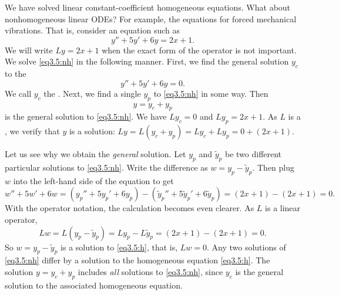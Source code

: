 We have solved linear constant-coefficient homogeneous 
equations.
What about nonhomogeneous linear ODEs?
For example, the equations for forced mechanical vibrations.
That is, consider an equation such as
\begin{equation} \label{eq3.5:nh}
y'' + 5y'+ 6y = 2x+1 .
\end{equation}
%
We will write $Ly = 2x+1$ when the exact form of the operator is not
important.
We solve \eqref{eq3.5:nh} in the following manner.  First, we find the general
solution $y_c$
to the \emph{}
\begin{equation} \label{eq3.5:h}
y'' + 5y'+ 6y = 0 .
\end{equation}
We call $y_c$ the \emph{}.
Next, we find a
single \emph{} $y_p$ to \eqref{eq3.5:nh} in some
way.  Then
\begin{equation*}
y = y_c + y_p
\end{equation*}
is the general solution to \eqref{eq3.5:nh}.  
We have $L y_c = 0$ and $L y_p = 2x+1$.  As
$L$ is a \emph{},
we verify that $y$ is a solution: $L y = L ( y_c + y_p) = L y_c + L y_p = 0
+ (2x+1)$.

Let us see
why we obtain the \emph{general} solution.
Let $y_p$ and $\tilde{y}_p$ be two different
particular solutions 
to \eqref{eq3.5:nh}.
Write the difference as
$w = y_p - \tilde{y}_p$.  Then plug $w$
into the left-hand side of the equation to get
\begin{equation*}
w'' + 5w'+ 6w =
(y_p'' + 5y_p'+ 6y_p) -
(\tilde{y}_p'' + 5\tilde{y}_p'+ 6\tilde{y}_p) =
(2x+1) - (2x+1) = 0 .
\end{equation*}
With the operator notation, the calculation becomes even clearer.
As $L$ is a linear operator,
\begin{equation*}
Lw = L(y_p - \tilde{y}_p) =
Ly_p - L\tilde{y}_p =
(2x+1)-(2x+1) = 0 .
\end{equation*}
So $w = y_p - \tilde{y}_p$ is a solution to \eqref{eq3.5:h}, that is,
$Lw = 0$.  Any two
solutions of \eqref{eq3.5:nh} differ by a solution to the homogeneous
equation \eqref{eq3.5:h}.  The solution $y = y_c + y_p$ includes \emph{all}
solutions to \eqref{eq3.5:nh},
since $y_c$ is the general solution to the associated homogeneous equation.

